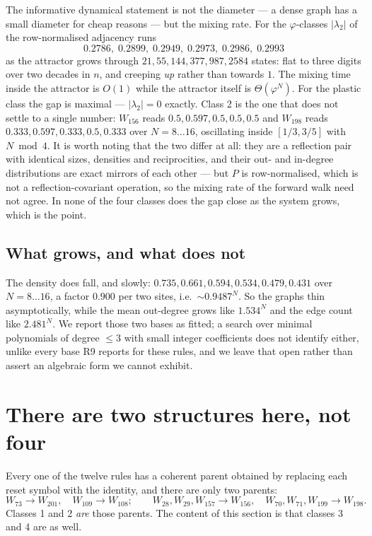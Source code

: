 \documentclass[11pt]{article}
\theoremstyle{plain}
\begin{document}
The informative dynamical statement is not the diameter --- a dense graph has a
small diameter for cheap reasons --- but the mixing rate. For the
$\varphi$-classes $|\lambda_2|$ of the row-normalised adjacency runs
\[
0.2786,\; 0.2899,\; 0.2949,\; 0.2973,\; 0.2986,\; 0.2993
\]
as the attractor grows through $21, 55, 144, 377, 987, 2584$ states: flat to
three digits over two decades in $n$, and creeping \emph{up} rather than towards
$1$. The mixing time inside the attractor is $O(1)$ while the attractor itself is
$\Theta(\varphi^N)$. For the plastic class the gap is maximal --- $|\lambda_2|=0$
exactly. Class 2 is the one that does not settle to a single number: $W_{156}$
reads $0.5, 0.597, 0.5, 0.5, 0.5$ and $W_{198}$ reads
$0.333, 0.597, 0.333, 0.5, 0.333$ over $N=8\ldots16$, oscillating inside
$[1/3, 3/5]$ with $N \bmod 4$. It is worth noting that the two differ at all:
they are a reflection pair with identical sizes, densities and reciprocities, and
their out- and in-degree distributions are exact mirrors of each other --- but
$P$ is row-normalised, which is not a reflection-covariant operation, so the
mixing rate of the forward walk need not agree. In none of the four classes does
the gap close as the system grows, which is the point.

\subsection{What grows, and what does not}

The density does fall, and slowly: $0.735, 0.661, 0.594, 0.534, 0.479, 0.431$
over $N=8\ldots16$, a factor $0.900$ per two sites, i.e.\ $\sim0.9487^N$. So the
graphs thin asymptotically, while the mean out-degree grows like $1.534^N$ and
the edge count like $2.481^N$. We report those two bases as fitted; a search over
minimal polynomials of degree $\le3$ with small integer coefficients does not
identify either, unlike every base R9 reports for these rules, and we leave that
open rather than assert an algebraic form we cannot exhibit.

\section{There are two structures here, not four}
\label{sec:parents}

Every one of the twelve rules has a coherent parent obtained by replacing each
reset symbol with the identity, and there are only two parents:
\[
W_{73}\to W_{201},\quad W_{109}\to W_{108};\qquad
W_{28},W_{29},W_{157}\to W_{156},\quad W_{70},W_{71},W_{199}\to W_{198}.
\]
Classes 1 and 2 \emph{are} those parents. The content of this section is that
classes 3 and 4 are as well.
\end{document}
